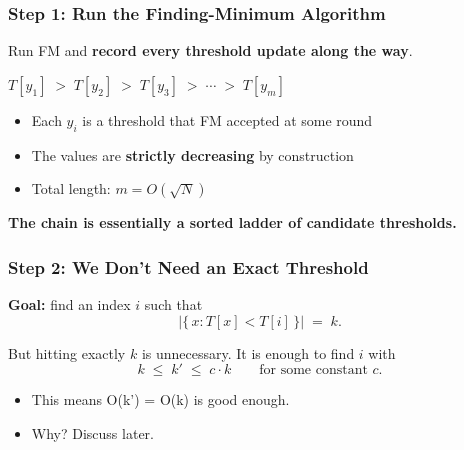 \documentclass[xcolor=table]{beamer}
\theoremstyle{remark}
\theoremstyle{plain}
\begin{document}
\begin{frame}
  \frametitle{Step 1: Run the Finding-Minimum Algorithm}
  Run FM and \textbf{record every threshold update along the way}.

  \vspace{0.6cm}
  \begin{center}
    {\large
    $T[y_1] \;>\; T[y_2] \;>\; T[y_3] \;>\; \cdots \;>\; T[y_m]$
    }
  \end{center}

  \vspace{0.6cm}
  \begin{itemize}
    \item Each $y_i$ is a threshold that FM accepted at some round
    \item The values are \textbf{strictly decreasing} by construction
    \item Total length: $m = O(\sqrt{N})$ 
  \end{itemize}

  \vspace{0.5cm}
  \textbf{The chain is essentially a sorted ladder of candidate thresholds.}
\end{frame}

\begin{frame}
  \frametitle{Step 2: We Don't Need an Exact Threshold}
  \textbf{Goal:} find an index $i$ such that
  \[
    \bigl|\{\,x : T[x] < T[i]\,\}\bigr| \;=\; k.
  \]

  \vspace{0.4cm}
  But hitting exactly $k$ is unnecessary. It is enough to find $i$ with
  \[
    k \;\le\; k' \;\le\; c \cdot k
    \qquad \text{for some constant } c.
  \]

  \vspace{0.4cm}
  \begin{itemize}
    \item This means O(k') = O(k) is good enough.
    \item Why? Discuss later.
  \end{itemize}
\end{frame}
\end{document}
